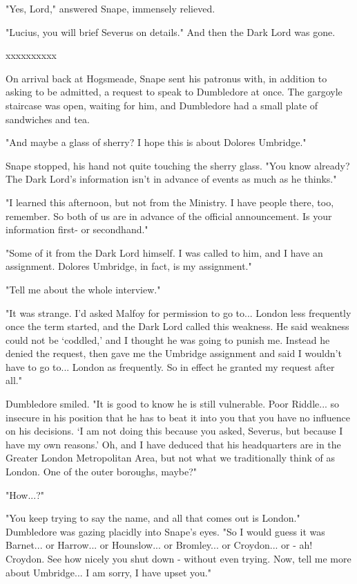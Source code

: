 \documentclass[a4paper,11pt]{article}
\begin{document}
"Yes, Lord," answered Snape, immensely relieved.

"Lucius, you will brief Severus on details." And then the Dark Lord was gone.

xxxxxxxxxx

On arrival back at Hogsmeade, Snape sent his patronus with, in addition to asking to be admitted, a request to speak to Dumbledore at once. The gargoyle staircase was open, waiting for him, and Dumbledore had a small plate of sandwiches and tea.

"And maybe a glass of sherry? I hope this is about Dolores Umbridge."

Snape stopped, his hand not quite touching the sherry glass. "You know already? The Dark Lord's information isn't in advance of events as much as he thinks."

"I learned this afternoon, but not from the Ministry. I have people there, too, remember. So both of us are in advance of the official announcement. Is your information first- or secondhand."

"Some of it from the Dark Lord himself. I was called to him, and I have an assignment. Dolores Umbridge, in fact, is my assignment."

"Tell me about the whole interview."

"It was strange. I'd asked Malfoy for permission to go to... London less frequently once the term started, and the Dark Lord called this weakness. He said weakness could not be `coddled,' and I thought he was going to punish me. Instead he denied the request, then gave me the Umbridge assignment and said I wouldn't have to go to... London as frequently. So in effect he granted my request after all."

Dumbledore smiled. "It is good to know he is still vulnerable. Poor Riddle... so insecure in his position that he has to beat it into you that you have no influence on his decisions. `I am not doing this because you asked, Severus, but because I have my own reasons.' Oh, and I have deduced that his headquarters are in the Greater London Metropolitan Area, but not what we traditionally think of as London. One of the outer boroughs, maybe?"

"How...?"

"You keep trying to say the name, and all that comes out is London." Dumbledore was gazing placidly into Snape's eyes. "So I would guess it was Barnet... or Harrow... or Hounslow... or Bromley... or Croydon... or - ah! Croydon. See how nicely you shut down - without even trying. Now, tell me more about Umbridge... I am sorry, I have upset you."
\end{document}
